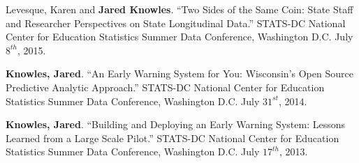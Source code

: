 \documentclass[margin,line]{res}
\begin{document}
\begin{resume}
Levesque, Karen and \textbf{Jared Knowles}. ``Two Sides of the Same Coin: State 
Staff and Researcher Perspectives on State Longitudinal Data.'' STATS-DC National Center for Education Statistics Summer Data Conference, Washington D.C. July $8^{th}$, 2015.


\textbf{Knowles, Jared}. ``An Early Warning System for You: Wisconsin’s Open Source Predictive Analytic Approach.'' STATS-DC National Center for Education Statistics Summer Data Conference, Washington D.C. July $31^{st}$, 2014.


\textbf{Knowles, Jared}. ``Building and Deploying an Early Warning System: Lessons Learned from a Large Scale Pilot.'' STATS-DC National Center for Education Statistics Summer Data Conference, Washington D.C. July $17^{th}$, 2013.






\end{resume}
\end{document}
